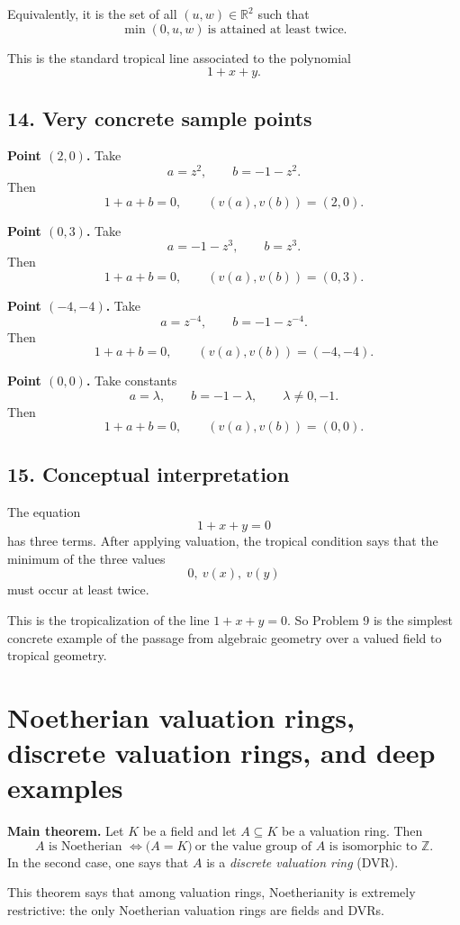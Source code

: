 \documentclass[12pt,a4paper]{article}
\theoremstyle{notespace}
\begin{document}
Equivalently, it is the set of all \((u,w)\in \mathbb R^2\) such that
\[
\boxed{
	\min(0,u,w)\ \text{is attained at least twice}.
}
\]

This is the standard tropical line associated to the polynomial
\[
1+x+y.
\]

\subsection{14. Very concrete sample points}

\textbf{Point \((2,0)\).}
Take
\[
a=z^2,
\qquad
b=-1-z^2.
\]
Then
\[
1+a+b=0,
\qquad
(v(a),v(b))=(2,0).
\]

\textbf{Point \((0,3)\).}
Take
\[
a=-1-z^3,
\qquad
b=z^3.
\]
Then
\[
1+a+b=0,
\qquad
(v(a),v(b))=(0,3).
\]

\textbf{Point \((-4,-4)\).}
Take
\[
a=z^{-4},
\qquad
b=-1-z^{-4}.
\]
Then
\[
1+a+b=0,
\qquad
(v(a),v(b))=(-4,-4).
\]

\textbf{Point \((0,0)\).}
Take constants
\[
a=\lambda,
\qquad
b=-1-\lambda,
\qquad
\lambda\neq 0,-1.
\]
Then
\[
1+a+b=0,
\qquad
(v(a),v(b))=(0,0).
\]

\subsection{15. Conceptual interpretation}

The equation
\[
1+x+y=0
\]
has three terms. After applying valuation, the tropical condition says that the minimum of the three values
\[
0,\ v(x),\ v(y)
\]
must occur at least twice.

This is the tropicalization of the line \(1+x+y=0\). So Problem 9 is the simplest concrete example of the passage from algebraic geometry over a valued field to tropical geometry.

\section{Noetherian valuation rings, discrete valuation rings, and deep examples}

\textbf{Main theorem.}
Let \(K\) be a field and let \(A\subseteq K\) be a valuation ring. Then
\[
A \text{ is Noetherian }
\iff
\bigl(A=K\bigr)\ \text{or the value group of }A\text{ is isomorphic to }\mathbb Z.
\]
In the second case, one says that \(A\) is a \emph{discrete valuation ring} (DVR).

This theorem says that among valuation rings, Noetherianity is extremely restrictive: the only Noetherian valuation rings are fields and DVRs.
\end{document}
